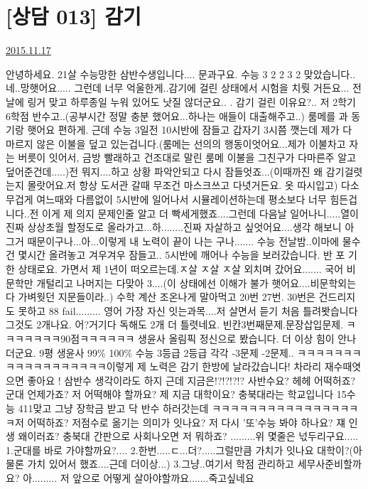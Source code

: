 \section{[상담 013] 감기}
\href{https://www.kockoc.com/Apoc/496702}{2015.11.17}

\vspace{5mm}




    안녕하세요. 21살 수능망한 삼반수생입니다.... 문과구요. 수능 3 2 2 3 2 맞았습니다..네..망햇어요..... 그런데 너무 억울한게..감기에 걸린 상태에서 시험을 치뤗 거든요... 전날에 링거 맞고 하루종일 누워 있어도 낫질 않더군요.. . 감기 걸린 이유요?.. 저 2학기 6학점 반수고..(공부시간 정말 충분 했어요...하나는 애들이 대출해주고..) 룸메를 과 동기랑 햇어요 편하게. 근데 수능 3일전 10시반에 잠들고 갑자기 3시쯤 깻는데 제가 다 마르지 않은 이불을 덮고 있는겁니다.(룸메는 선의의 행동이엇어요...제가 이불차고 자는 버릇이 잇어서, 금방 빨래하고 건조대로 말린 룸메 이불을 그친구가 다마른주 알고 덮어준건데.....)전 뭐지....하고 상황 파악안되고 다시 잠들엇죠...(이때까진 왜 감기걸렷는지 몰랏어요.저 항상 도서관 갈때 무조건 마스크쓰고 다녓거든요. 옷 따시입고) 다소 무겁게 여느때와 다름없이 5시반에 일어나서 시뮬레이션하는데 평소보다 너무 힘든겁니다..전 이게 제 의지 문제인줄 알고 더 빡세게했죠....그런데 다음날 일어나니.....열이 진짜 상상초월 할정도로 올라가고...하........진짜 자살하고 싶엇어요....생각 해보니 아 그거 때문이구나...아...이렇게 내 노력이 끝이 나는 구나....... 수능 전날밤..이마에 물수건 몇시간 올려놓고 겨우겨우 잠들고.. 5시반에 깨어나 수능을 보러갔습니다. 반 포 기 한 상태로요. 가면서 제 1년이 떠오르는데.ㅈ살 ㅈ살 ㅈ살 외치며 갔어요....... 국어 비문학만 개털리고 나머지는 다맞아 3....(이 상태에선 이해가 불가 햇어요....비문학외는 다 가벼웟던 지문들이라..) 수학 계산 조온나게 말아먹고 20번 27번. 30번은 건드리지도 못하고 88 fail......... 영어 가장 자신 잇는과목....저 살면서 듣기 처음 틀려봣습니다 그것도 2개나요. 어?거기다 독해도 2개 더 틀렷네요. 빈칸3번째문제.문장삽입문제. ㅋㅋㅋㅋㅋㅋㅋ90점ㅋㅋㅋㅋㅋㅋ 생윤사 올림픽 정신으로 봤습니다. 더 이상 힘이 안나더군요. 9평 생윤사 99$\%$ 100$\%$ 수능 3등급 2등급 각각 -3문제 -2문제.. ㅋㅋㅋㅋㅋㅋㅋㅋㅋㅋㅋㅋㅋㅋㅋㅋㅋㅋ이렇게 제 노력은 감기 한방에 날라갔습니다! 차라리 재수때엿으면 좋아요 ! 삼반수 생각이라도 하지 근데 지금은!?!?!?!? 사반수요? 헤헤 어떡허죠?군대 언제가죠? 저 어떡해야 할까요? 제 지금 대학이요? 충북대라는 학교입니다 15수능 411맞고 그냥 장학금 받고 닥 반수 하러갓는데  ㅋㅋㅋㅋㅋㅋㅋㅋㅋㅋㅋㅋㅋㅋㅋㅋㅋ저 어떡하죠? 저점수로 옮기는 의미가 잇나요?  저 다시 '또'수능 봐야 하나요? 쟤 인생 왜이러죠? 충북대 간판으로 사회나오면 저 뭐하죠? .........위 몇줄은 넋두리구요..... 1.군대를 바로 가야할까요?.... 2.한번.....ㄷ...더?.....그럴만큼 가치가 잇나요 대학이?(아 물론 가치 있어서 했죠....근데 더이상...) 3.그냥..여기서 학점 관리하고 세무사준비할까요? 아......... 저 앞으로 어떻게 살아야할까요.......죽고싶네요


